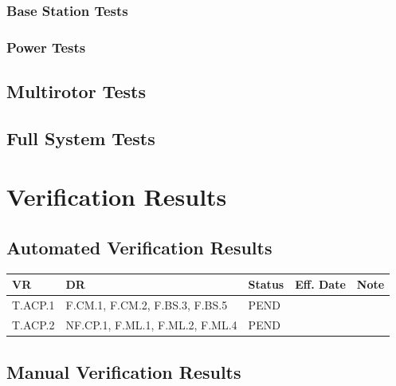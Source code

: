 \documentclass[10pt,letterpaper]{article}
\begin{document}
\subsubsection{Base Station Tests}


\subsubsection{Power Tests}


\subsection{Multirotor Tests}


\subsection{Full System Tests}


\section{Verification Results} \label{results}

\subsection{Automated Verification Results}
\begin{table}[H]
	\centering
	\begin{tabular}{lllll}
	\hline
	\textbf{VR} & \textbf{DR} & \textbf{Status} & \textbf{Eff. Date} & \textbf{Note}\\
	\hline
	T.ACP.1 & F.CM.1, F.CM.2, F.BS.3, F.BS.5 & PEND   & \\
	T.ACP.2 & NF.CP.1, F.ML.1, F.ML.2, F.ML.4 & PEND   & \\
	\hline
	\end{tabular}
\end{table}

\subsection{Manual Verification Results}
\end{document}
